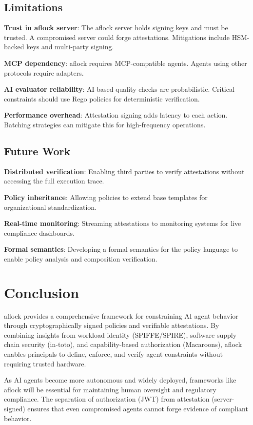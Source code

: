 \documentclass[11pt,a4paper]{article}
\begin{document}
\subsection{Limitations}

\textbf{Trust in aflock server}: The aflock server holds signing keys and must be trusted. A compromised server could forge attestations. Mitigations include HSM-backed keys and multi-party signing.

\textbf{MCP dependency}: aflock requires MCP-compatible agents. Agents using other protocols require adapters.

\textbf{AI evaluator reliability}: AI-based quality checks are probabilistic. Critical constraints should use Rego policies for deterministic verification.

\textbf{Performance overhead}: Attestation signing adds latency to each action. Batching strategies can mitigate this for high-frequency operations.

\subsection{Future Work}

\textbf{Distributed verification}: Enabling third parties to verify attestations without accessing the full execution trace.

\textbf{Policy inheritance}: Allowing policies to extend base templates for organizational standardization.

\textbf{Real-time monitoring}: Streaming attestations to monitoring systems for live compliance dashboards.

\textbf{Formal semantics}: Developing a formal semantics for the policy language to enable policy analysis and composition verification.

\section{Conclusion}

aflock provides a comprehensive framework for constraining AI agent behavior through cryptographically signed policies and verifiable attestations. By combining insights from workload identity (SPIFFE/SPIRE), software supply chain security (in-toto), and capability-based authorization (Macaroons), aflock enables principals to define, enforce, and verify agent constraints without requiring trusted hardware.

As AI agents become more autonomous and widely deployed, frameworks like aflock will be essential for maintaining human oversight and regulatory compliance. The separation of authorization (JWT) from attestation (server-signed) ensures that even compromised agents cannot forge evidence of compliant behavior.
\end{document}
